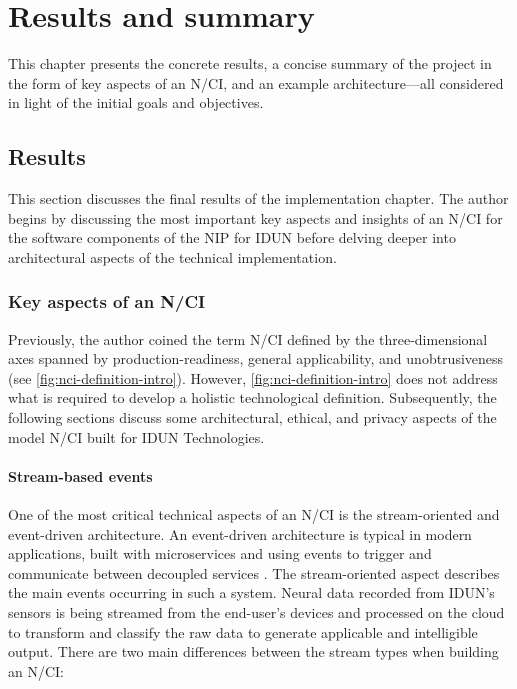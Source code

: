 \chapter{Results and summary}
\graphicspath{{Chapter5/Figs/}{Chapter5/Figs/}}

This chapter presents the concrete results, a concise summary of the project in the form of key aspects of an N/CI, and an example architecture—all considered in light of the initial goals and objectives.

\section{Results}
\label{chapter5-results}

This section discusses the final results of the implementation chapter. The author begins by discussing the most important key aspects and insights of an N/CI for the software components of the NIP for IDUN before delving deeper into architectural aspects of the technical implementation.

\subsection{Key aspects of an N/CI}
\label{chapter5-key-aspects}

Previously, the author coined the term N/CI defined by the three-dimensional axes spanned by production-readiness, general applicability, and unobtrusiveness (see \autoref{fig:nci-definition-intro}). However, \autoref{fig:nci-definition-intro} does not address what is required to develop a holistic technological definition. Subsequently, the following sections discuss some architectural, ethical, and privacy aspects of the model N/CI built for IDUN Technologies.

\subsubsection{Stream-based events}
\label{chapter5-stream-based-events}

One of the most critical technical aspects of an N/CI is the stream-oriented and event-driven architecture. An event-driven architecture is typical in modern applications, built with microservices and using events to trigger and communicate between decoupled services \citep{amazon_web_services_inc_event-driven_nodate}. The stream-oriented aspect describes the main events occurring in such a system. Neural data recorded from IDUN’s sensors is being streamed from the end-user’s devices and processed on the cloud to transform and classify the raw data to generate applicable and intelligible output. There are two main differences between the stream types when building an N/CI:

